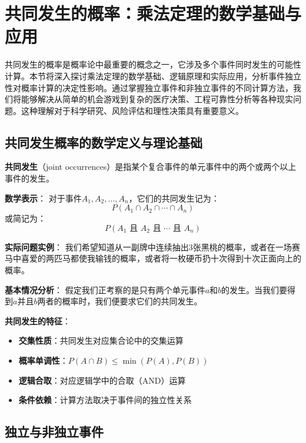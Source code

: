 \section{共同发生的概率：乘法定理的数学基础与应用}

\begin{logicbox}[title=引言]
共同发生的概率是概率论中最重要的概念之一，它涉及多个事件同时发生的可能性计算。本节将深入探讨乘法定理的数学基础、逻辑原理和实际应用，分析事件独立性对概率计算的决定性影响。通过掌握独立事件和非独立事件的不同计算方法，我们将能够解决从简单的机会游戏到复杂的医疗决策、工程可靠性分析等各种现实问题。这种理解对于科学研究、风险评估和理性决策具有重要意义。
\end{logicbox}

\subsection{共同发生概率的数学定义与理论基础}

\begin{theorembox}[title=共同发生的数学定义]
\textbf{共同发生}（joint occurrences）是指某个复合事件的单元事件中的两个或两个以上事件的发生。

\textbf{数学表示}：
对于事件$A_1, A_2, \ldots, A_n$，它们的共同发生记为：
$$P(A_1 \cap A_2 \cap \cdots \cap A_n)$$
或简记为：
$$P(A_1 \text{ 且 } A_2 \text{ 且 } \cdots \text{ 且 } A_n)$$

\textbf{实际问题实例}：
我们希望知道从一副牌中连续抽出3张黑桃的概率，或者在一场赛马中喜爱的两匹马都使我输钱的概率，或者将一枚硬币扔十次得到十次正面向上的概率。

\textbf{基本情况分析}：
假定我们正考察的是只有两个单元事件$a$和$b$的发生。当我们要得到$a$并且$b$两者的概率时，我们便要求它们的共同发生。

\textbf{共同发生的特征}：
\begin{itemize}
\item \textbf{交集性质}：共同发生对应集合论中的交集运算
\item \textbf{概率单调性}：$P(A \cap B) \leq \min(P(A), P(B))$
\item \textbf{逻辑合取}：对应逻辑学中的合取（AND）运算
\item \textbf{条件依赖}：计算方法取决于事件间的独立性关系
\end{itemize}
\end{theorembox}

\subsection{独立与非独立事件}

